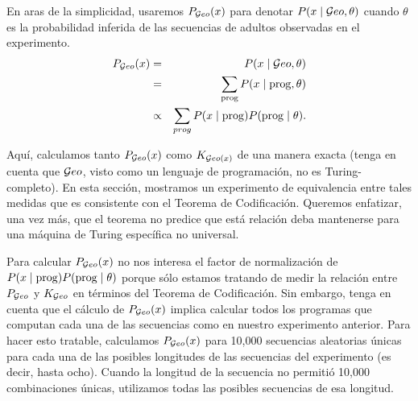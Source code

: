 En aras de la simplicidad, usaremos $P_{\mathcal Geo}(x)$ para denotar $P(x \mid \mathcal Geo, \theta)$ cuando $\theta$ es la probabilidad inferida de las secuencias de adultos observadas en el experimento.
%
\begin{eqnarray}
\label{eqG}
P_{\mathcal Geo}(x) &=& P(x \mid \mathcal Geo, \theta)\\
&=& \sum_{{\rm prog}} P(x \mid {\rm prog}, \theta)\\
&\propto &\sum_{prog} P(x \mid {\rm prog}) P({\rm prog} \mid \theta).
\end{eqnarray}
%


Aquí, calculamos tanto $P_{\mathcal Geo}(x)$ como $K_{\mathcal Geo(x)}$ de una manera exacta (tenga en cuenta que $\mathcal Geo$, visto como un lenguaje de programación, no es Turing-completo). En esta sección, mostramos un experimento de equivalencia entre tales medidas que es consistente con el Teorema de Codificación. Queremos enfatizar, una vez más, que el teorema no predice que está relación deba mantenerse para una máquina de Turing específica no universal.



Para calcular $P_{\mathcal Geo}(x)$ no nos interesa el factor de normalización de $P(x \mid {\rm prog}) P({\rm prog} \mid \theta)$ porque sólo estamos tratando de medir la relación entre $P_{\mathcal Geo}$ y $K_{\mathcal Geo}$ en términos del Teorema de Codificación. Sin embargo, tenga en cuenta que el cálculo de $P_{\mathcal Geo}(x)$ implica calcular todos los programas que computan cada una de las secuencias como en nuestro experimento anterior. Para hacer esto tratable, calculamos $P_{\mathcal Geo}(x)$ para 10,000 secuencias aleatorias únicas para cada una de las posibles longitudes de las secuencias del experimento (es decir, hasta ocho). Cuando la longitud de la secuencia no permitió 10,000 combinaciones únicas, utilizamos todas las posibles secuencias de esa longitud.

